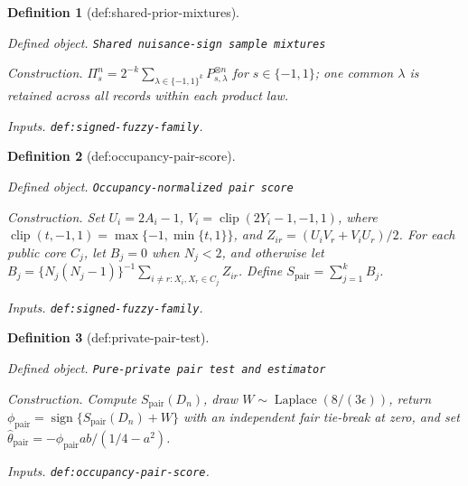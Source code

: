 \documentclass{article}
\newtheorem{definition}{Definition}
\begin{document}
\begin{definition}[def:shared-prior-mixtures]\label{def:shared-prior-mixtures}
\par\smallskip\noindent\emph{Defined object.} \texttt{Shared nuisance-\allowbreak{}sign sample mixtures}
\par\smallskip\noindent\emph{Construction.} \(\Pi_s^n=2^{-k}\sum_{\lambda\in\{-1,1\}^k}P_{s,\lambda}^{\otimes n}\) for \(s\in\{-1,1\}\); one common \(\lambda\) is retained across all records within each product law.
\par\smallskip\noindent\emph{Inputs.} \texttt{def:\allowbreak{}signed-\allowbreak{}fuzzy-\allowbreak{}family}.
\end{definition}

\begin{definition}[def:occupancy-pair-score]\label{def:occupancy-pair-score}
\par\smallskip\noindent\emph{Defined object.} \texttt{Occupancy-\allowbreak{}normalized pair score}
\par\smallskip\noindent\emph{Construction.} Set \(U_i=2A_i-1\), \(V_i=\operatorname{clip}(2Y_i-1,-1,1)\), where \(\operatorname{clip}(t,-1,1)=\max\{-1,\min\{t,1\}\}\), and \(Z_{ir}=(U_iV_r+V_iU_r)/2\). For each public core \(C_j\), let \(B_j=0\) when \(N_j<2\), and otherwise let \(B_j=\{N_j(N_j-1)\}^{-1}\sum_{i\ne r:X_i,X_r\in C_j}Z_{ir}\). Define \(S_{\mathrm{pair}}=\sum_{j=1}^kB_j\).
\par\smallskip\noindent\emph{Inputs.} \texttt{def:\allowbreak{}signed-\allowbreak{}fuzzy-\allowbreak{}family}.
\end{definition}

\begin{definition}[def:private-pair-test]\label{def:private-pair-test}
\par\smallskip\noindent\emph{Defined object.} \texttt{Pure-\allowbreak{}private pair test and estimator}
\par\smallskip\noindent\emph{Construction.} Compute \(S_{\mathrm{pair}}(D_n)\), draw \(W\sim\operatorname{Laplace}(8/(3\epsilon))\), return \(\phi_{\mathrm{pair}}=\operatorname{sign}\{S_{\mathrm{pair}}(D_n)+W\}\) with an independent fair tie-break at zero, and set \(\widehat\theta_{\mathrm{pair}}=-\phi_{\mathrm{pair}}ab/(1/4-a^2)\).
\par\smallskip\noindent\emph{Inputs.} \texttt{def:\allowbreak{}occupancy-\allowbreak{}pair-\allowbreak{}score}.
\end{definition}
\end{document}
